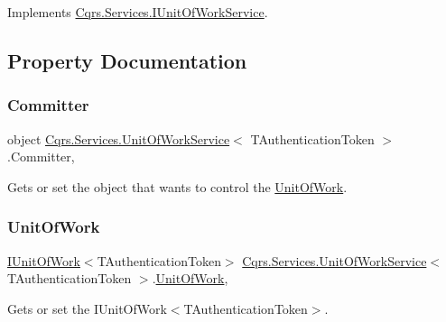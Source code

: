 Implements \hyperlink{interfaceCqrs_1_1Services_1_1IUnitOfWorkService_a54f241cd90bbebf9cc73d5a296ed593b_a54f241cd90bbebf9cc73d5a296ed593b}{Cqrs.\+Services.\+I\+Unit\+Of\+Work\+Service}.



\subsection{Property Documentation}
\mbox{\label{classCqrs_1_1Services_1_1UnitOfWorkService_aabeccb6ba949fe02b8676b324f85950b_aabeccb6ba949fe02b8676b324f85950b}} 
\subsubsection{\texorpdfstring{Committer}{Committer}}
{\footnotesize\ttfamily object \hyperlink{classCqrs_1_1Services_1_1UnitOfWorkService}{Cqrs.\+Services.\+Unit\+Of\+Work\+Service}$<$ T\+Authentication\+Token $>$.Committer\hspace{0.3cm}{\ttfamily [get]}, {\ttfamily [protected]}}



Gets or set the object that wants to control the \hyperlink{classCqrs_1_1Services_1_1UnitOfWorkService_a1ba76512e37e5006c2b65d071803e99f_a1ba76512e37e5006c2b65d071803e99f}{Unit\+Of\+Work}. 

\mbox{\label{classCqrs_1_1Services_1_1UnitOfWorkService_a1ba76512e37e5006c2b65d071803e99f_a1ba76512e37e5006c2b65d071803e99f}} 
\subsubsection{\texorpdfstring{Unit\+Of\+Work}{UnitOfWork}}
{\footnotesize\ttfamily \hyperlink{interfaceCqrs_1_1Domain_1_1IUnitOfWork}{I\+Unit\+Of\+Work}$<$T\+Authentication\+Token$>$ \hyperlink{classCqrs_1_1Services_1_1UnitOfWorkService}{Cqrs.\+Services.\+Unit\+Of\+Work\+Service}$<$ T\+Authentication\+Token $>$.\hyperlink{classCqrs_1_1Domain_1_1UnitOfWork}{Unit\+Of\+Work}\hspace{0.3cm}{\ttfamily [get]}, {\ttfamily [protected]}}



Gets or set the I\+Unit\+Of\+Work$<$\+T\+Authentication\+Token$>$. 

